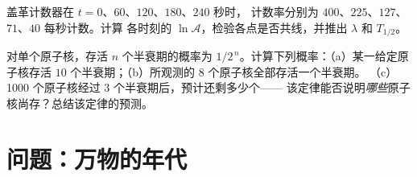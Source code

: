 \begin{exercise}[$\star\star\star$]\label{exo:g12:radioactive-decay:14}
盖革计数器在 $t = 0$、$60$、$120$、$180$、$240$ 秒时，
计数率分别为 $400$、$225$、$127$、$71$、$40$ 每秒计数。计算
各时刻的 $\ln \mathcal A$，检验各点是否共线，并推出 $\lambda$ 和
$T_{1/2}$。
\end{exercise}

\begin{exercise}[$\star\star\star$]\label{exo:g12:radioactive-decay:15}
对单个原子核，存活 $n$ 个半衰期的概率为
$1/2^{\,n}$。计算下列概率：（a）某一给定原子核存活
$10$ 个半衰期；（b）所观测的 $8$ 个原子核全部存活一个半衰期。
（c）\num{1000} 个原子核经过 $3$ 个半衰期后，预计还剩多少个——
该定律能否说明\emph{哪些}原子核尚存？总结该定律的预测。
\end{exercise}

\section{问题：万物的年代}

